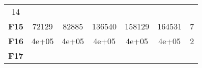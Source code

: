 \documentclass[12pt,a4paper]{article}
\begin{document}
\begin{longtable}[c]{@{}ccccccc@{}}
\begin{minipage}[t]{0.07\columnwidth}\centering\strut
14
\strut\end{minipage}\tabularnewline
\begin{minipage}[t]{0.11\columnwidth}\centering\strut
\textbf{F15}
\strut\end{minipage} &
\begin{minipage}[t]{0.08\columnwidth}\centering\strut
72129
\strut\end{minipage} &
\begin{minipage}[t]{0.08\columnwidth}\centering\strut
82885
\strut\end{minipage} &
\begin{minipage}[t]{0.09\columnwidth}\centering\strut
136540
\strut\end{minipage} &
\begin{minipage}[t]{0.10\columnwidth}\centering\strut
158129
\strut\end{minipage} &
\begin{minipage}[t]{0.11\columnwidth}\centering\strut
164531
\strut\end{minipage} &
\begin{minipage}[t]{0.07\columnwidth}\centering\strut
7
\strut\end{minipage}\tabularnewline
\begin{minipage}[t]{0.11\columnwidth}\centering\strut
\textbf{F16}
\strut\end{minipage} &
\begin{minipage}[t]{0.08\columnwidth}\centering\strut
4e+05
\strut\end{minipage} &
\begin{minipage}[t]{0.08\columnwidth}\centering\strut
4e+05
\strut\end{minipage} &
\begin{minipage}[t]{0.09\columnwidth}\centering\strut
4e+05
\strut\end{minipage} &
\begin{minipage}[t]{0.10\columnwidth}\centering\strut
4e+05
\strut\end{minipage} &
\begin{minipage}[t]{0.11\columnwidth}\centering\strut
4e+05
\strut\end{minipage} &
\begin{minipage}[t]{0.07\columnwidth}\centering\strut
2
\strut\end{minipage}\tabularnewline
\begin{minipage}[t]{0.11\columnwidth}\centering\strut
\textbf{F17}
\strut\end{minipage} &

\end{longtable}
\end{document}

